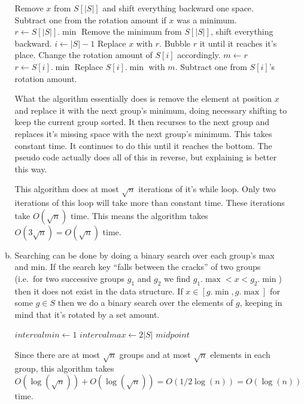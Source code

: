 \documentclass[letterpaper,10pt]{article}
\begin{document}
\begin{enumerate}
\begin{enumerate}[a)]
		\begin{algorithmic}
				\State Remove $x$ from $S[|S|]$ and shift everything backward one space.
				\State Subtract one from the rotation amount if $x$ was a minimum.
				\State \Return
			\Else
				\State $r \gets S[|S|].\min$
				\State Remove the minimum from $S[|S|]$, shift everything backward.
				\State $i \gets |S|-1$
						\State Replace $x$ with $r$.
						\State Bubble $r$ it until it reaches it's place.
						\State Change the rotation amount of $S[i]$ accordingly.
						\State \Return
					\Else
						\State $m \gets r$
						\State $r \gets S[i].\min$
						\State Replace $S[i].\min$ with $m$.
						\State Subtract one from $S[i]$'s rotation amount.
					\EndIf
				\EndWhile
			\EndIf
		\EndFunction
		\end{algorithmic}
		What the algorithm essentially does is remove the element at position $x$ and replace it with the next group's minimum, doing necessary shifting to keep the current group sorted. It then recurses to the next group and replaces it's missing space with the next group's minimum. This takes constant time. It continues to do this until it reaches the bottom. The pseudo code actually does all of this in reverse, but explaining is better this way.

		This algorithm does at most $\sqrt{n}$ iterations of it's while loop. Only two iterations of this loop will take more than constant time. These iterations take $O(\sqrt{n})$ time. This means the algorithm takes $O(3 \sqrt{n}) = O(\sqrt{n})$ time.

		\item Searching can be done by doing a binary search over each group's max and min. If the search key ``falls between the cracks'' of two groups (i.e.\ for two successive groups $g_1$ and $g_2$ we find $g_1.\max < x < g_2.\min$) then it does not exist in the data structure. If $x \in [g.\min, g.\max]$ for some $g \in S$ then we do a binary search over the elements of $g$, keeping in mind that it's rotated by a set amount.
		\begin{algorithmic}
		\Function{SEARCH}{$S$, $x$}
			\State $intervalmin \gets 1$
			\State $intervalmax \gets 2|S|$
			\While{$intervalmin < intervalmax$}
				\State $midpoint$
			\EndWhile
		\EndFunction
		\end{algorithmic}

		Since there are at most $\sqrt{n}$ groups and at most $\sqrt{n}$ elements in each group, this algorithm takes $O(\log(\sqrt{n}))+O(\log(\sqrt{n})) = O(1/2 \log(n)) = O(\log(n))$ time.


\end{enumerate}
\end{enumerate}
\end{document}
